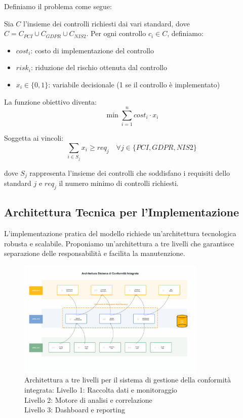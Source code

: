 Definiamo il problema come segue:

Sia $C$ l'insieme dei controlli richiesti dai vari standard, dove $C = C_{PCI} \cup C_{GDPR} \cup C_{NIS2}$. Per ogni controllo $c_i \in C$, definiamo:
\begin{itemize}
    \item $cost_i$: costo di implementazione del controllo
    \item $risk_i$: riduzione del rischio ottenuta dal controllo
    \item $x_i \in \{0,1\}$: variabile decisionale (1 se il controllo è implementato)
\end{itemize}

La funzione obiettivo diventa:
\begin{equation}
\min \sum_{i=1}^{n} cost_i \cdot x_i
\end{equation}

Soggetta ai vincoli:
\begin{equation}
\sum_{i \in S_j} x_i \geq req_j \quad \forall j \in \{PCI, GDPR, NIS2\}
\end{equation}

dove $S_j$ rappresenta l'insieme dei controlli che soddisfano i requisiti dello standard $j$ e $req_j$ il numero minimo di controlli richiesti.

\subsection{Architettura Tecnica per l'Implementazione}
\label{subsec:4.3.2_architettura}

L'implementazione pratica del modello richiede un'architettura tecnologica robusta e scalabile. Proponiamo un'architettura a tre livelli che garantisce separazione delle responsabilità e facilita la manutenzione.

\begin{figure}[h]
\centering
\includegraphics[width=0.8\textwidth]{thesis_figures/cap4/figura_4_2_architettura_premium.pdf}
\caption[Architettura a tre livelli per il sistema di gestione della conformità integrata]{Architettura a tre livelli per il sistema di gestione della conformità integrata: Livello 1: Raccolta dati e monitoraggio\\
Livello 2: Motore di analisi e correlazione\\
Livello 3: Dashboard e reporting}
\label{fig:architettura_sistema}
\end{figure}

